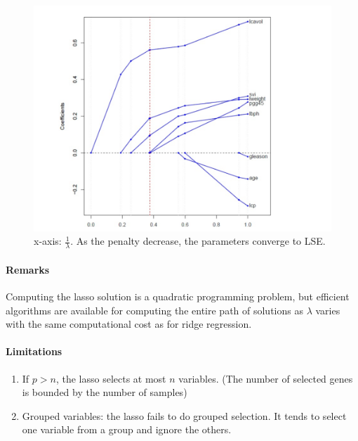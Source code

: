\documentclass[11pt]{article}
\begin{document}
 \begin{figure}[h]
	\centering
	\includegraphics[scale=0.6]{lasso.png}
	\caption{x-axis: $\frac{1}{\lambda}$. As the penalty decrease, the parameters converge to LSE.}
\end{figure}

 \paragraph{Remarks}
 Computing the lasso solution is a quadratic programming problem, but efficient algorithms are available for computing the entire path of solutions as $\lambda$ varies with the same computational cost as for ridge regression.
 \paragraph{Limitations}
 \begin{enumerate}
 	\item If $p > n$, the lasso selects at most $n$ variables. (The number of selected genes is bounded by the number of samples)
 	\item Grouped variables: the lasso fails to do grouped selection. It tends to select one variable from a group and ignore the others.
 \end{enumerate}
 
\end{document}

